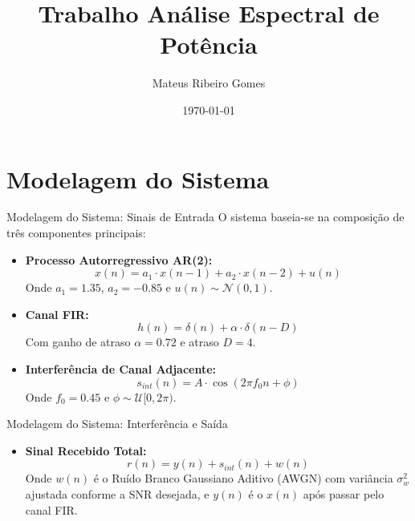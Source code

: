 \documentclass[10pt]{beamer}
\title[Processos Estocásticos II]{Trabalho Análise Espectral de Potência}
\author{Mateus Ribeiro Gomes}
\date{\today}
\begin{document}
\begin{frame}
    \titlepage
\end{frame}

\section{Modelagem do Sistema}

\begin{frame}{Modelagem do Sistema: Sinais de Entrada}
    O sistema baseia-se na composição de três componentes principais:
    \vfill
    \begin{itemize}
        \item \textbf{Processo Autorregressivo AR(2):}
        \begin{equation*}
            x(n) = a_1 \cdot x(n-1) + a_2 \cdot x(n-2) + u(n)
        \end{equation*}
        Onde $a_1 = 1.35$, $a_2 = -0.85$ e $u(n) \sim \mathcal{N}(0, 1)$.
        
        \item \textbf{Canal FIR:}
        \begin{equation*}
            h(n) = \delta(n) + \alpha \cdot \delta (n-D)
        \end{equation*}
        Com ganho de atraso $\alpha = 0.72$ e atraso $D = 4$.
        \item \textbf{Interferência de Canal Adjacente:}
        \begin{equation*}
            s_{int}(n) = A \cdot \cos(2 \pi f_0 n + \phi)
        \end{equation*}
            Onde $f_0 = 0.45$ e $\phi \sim \mathcal{U}[0, 2\pi)$.
        
    \end{itemize}
\end{frame}

\begin{frame}{Modelagem do Sistema: Interferência e Saída}
    \begin{itemize}
        \item \textbf{Sinal Recebido Total:}
        \begin{equation*}
            r(n) = y(n) + s_{int}(n) + w(n)
        \end{equation*}
            Onde $w(n)$ é o Ruído Branco Gaussiano Aditivo (AWGN) com variância $\sigma_w^2$ ajustada conforme a SNR desejada, e $y(n)$ é o $x(n)$ após
            passar pelo canal FIR.
    \end{itemize}
\end{frame}
\end{document}
